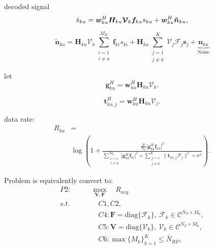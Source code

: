 \documentclass[conference]{IEEEtran}
\begin{document}
decoded signal
\begin{equation}{\label{eq:hats}}
\hat{s}_{ku} = \bm{w}_{ku}^H \bm{H}_{ku} \bm{\mathcal{V}}_k \bm{f}_{ku} s_{ku} + \bm{w}_{ku}^H \bm{\tilde{n}}_{ku},
\end{equation}

\begin{equation}\label{Eq:ntilde}
\bm{\tilde{n}}_{ku}=\bm{H}_{ku} \bm{\mathcal{V}}_k\sum_{\substack{i=1 \\ i\neq u}}^{M_K}\bm{f}_{ki}s_{ki} + \bm{H}_{ku}\sum_{\substack{j=1\\j\neq k}}^{K}\bm{\mathcal{V}}_j\bm{\mathcal{F}}_j\bm{s}_j+ \underbrace{\bm{n}_{ku}}_\text{Noise}
\end{equation}

let
\begin{equation}\label{eq:defgu}
{\bm{g}}_{ku}^H = \bm{w}^H_{ku} \bm{H}_{ku} \bm{\mathcal{V}}_{k}.
\end{equation}

\begin{equation}\label{eq:def}
{\bm{t}}_{ku,j}^H = \bm{w}^H_{ku} \bm{H}_{ku} \bm{\mathcal{V}}_{j}.
\end{equation}

data rate:
\begin{equation}
\begin{aligned}
R_{ku} &= \\
&\log\left(1+\frac{\frac{P}{N_U}|{\bm{g}}_{ku}^H \bm{f}_{ku}|^2}{
\sum_{\substack{i=1 \\ i\neq u}}^{M_k}\left|{\bm{g}}_{ku}^H\bm{f}_{ki}\right|^2+\sum_{\substack{j=1\\j\neq k}}^{K}\|\bm{t}_{ku,j}\bm{\mathcal{F}}_j\|^2+\sigma^2}\right).
\end{aligned}
\end{equation}


Problem is equivalently convert to:
\begin{equation}
\begin{aligned}
P2:\qquad&\max_{\bm V,\bm F} \quad R_{avg}\\
s.t. & \quad C1,C2,\\
&\quad C4:\bm{F}=\mathrm{diag}\{\bm{\mathcal{F}}_k\},\ \bm{\mathcal{F}}_k\in \mathcal{C}^{N_T\times M_k},\\
&\quad C5:\bm{V}=\mathrm{diag}\{\bm{\mathcal{V}}_k\},\ \bm{\mathcal{V}}_k\in \mathcal{C}^{N_T\times M_k},\\
&\quad C6:\max \{M_k\}_{k=1}^K\leq \bar{N}_{RF},
\end{aligned}
\end{equation}
\end{document}

